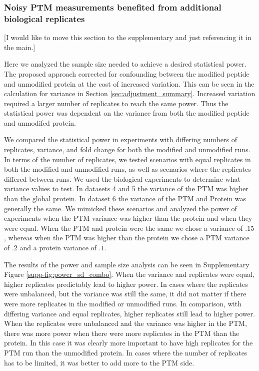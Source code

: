 \documentclass[mcp]{article}
\numberwithin{table}{section}
\def\todo#1{{\color{red}[#1]}}
\begin{document}
\subsubsection*{Noisy PTM measurements benefited from additional biological replicates}

\todo{I would like to move this section to the supplementary and just referencing it in the main.}

Here we analyzed the sample size needed to achieve a desired statistical power. The proposed approach corrected for confounding between the modified peptide and unmodified protein at the cost of increased variation. This can be seen in the calculation for variance in Section \ref{sec:adjustment_summary}. Increased variation required a larger number of replicates to reach the same power. Thus the statistical power was dependent on the variance from both the modified peptide and unmodifed protein.

We compared the statistical power in experiments with differing numbers of replicates, variance, and fold change for both the modified and unmodified runs. In terms of the number of replicates, we tested scenarios with equal replicates in both the modified and unmodified runs, as well as scenarios where the replicates differed between runs. We used the biological experiments to determine what variance values to test. In datasets 4 and 5 the variance of the PTM was higher than the global protein. In dataset 6 the variance of the PTM and Protein was generally the same. We mimicked these scenarios and analyzed the power of experiments when the PTM variance was higher than the protein and when they were equal. When the PTM and protein were the same we chose a variance of $.15$, whereas when the PTM was higher than the protein we chose a PTM variance of $.2$ and a protein variance of $.1$.

The results of the power and sample size analysis can be seen in Supplementary Figure \ref{supp-fig:power_sd_combo}. When the variance and replicates were equal, higher replicates predictably lead to higher power. In cases where the replicates were unbalanced, but the variance was still the same, it did not matter if there were more replicates in the modified or unmodified runs. In comparison, with differing variance and equal replicates, higher replicates still lead to higher power. When the replicates were unbalanced and the variance was higher in the PTM, there was more power when there were more replicates in the PTM than the protein. In this case it was clearly more important to have high replicates for the PTM run than the unmodified protein. In cases where the number of replicates has to be limited, it was better to add more to the PTM side.
\end{document}
